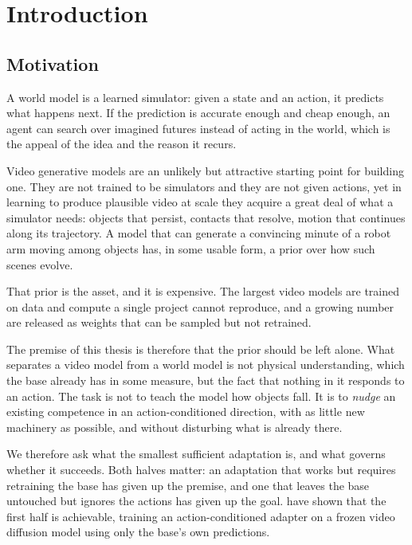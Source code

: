 \chapter{Introduction}
\label{ch:introduction}

\section{Motivation}
\label{sec:motivation}

A world model is a learned simulator: given a state and an action, it
predicts what happens next. If the prediction is accurate enough and cheap
enough, an agent can search over imagined futures instead of acting in the
world, which is the appeal of the idea and the reason it recurs.

Video generative models are an unlikely but attractive starting point for
building one. They are not trained to be simulators and they are not given
actions, yet in learning to produce plausible video at scale they acquire a
great deal of what a simulator needs: objects that persist, contacts that
resolve, motion that continues along its trajectory. A model that can
generate a convincing minute of a robot arm moving among objects has, in
some usable form, a prior over how such scenes evolve.

That prior is the asset, and it is expensive. The largest video models are
trained on data and compute a single project cannot reproduce, and a growing
number are released as weights that can be sampled but not retrained.

The premise of this thesis is therefore that the prior should be left alone.
What separates a video model from a world model is not physical
understanding, which the base already has in some measure, but the fact that
nothing in it responds to an action. The task is not to teach the model how
objects fall. It is to \emph{nudge} an existing competence in an
action-conditioned direction, with as little new machinery as possible, and
without disturbing what is already there.

We therefore ask what the smallest sufficient adaptation is, and what
governs whether it succeeds. Both halves matter: an adaptation that works
but requires retraining the base has given up the premise, and one that
leaves the base untouched but ignores the actions has given up the goal.
\citet{rigter2024avid} have shown that the first half is achievable,
training an action-conditioned adapter on a frozen video diffusion model
using only the base's own predictions.

